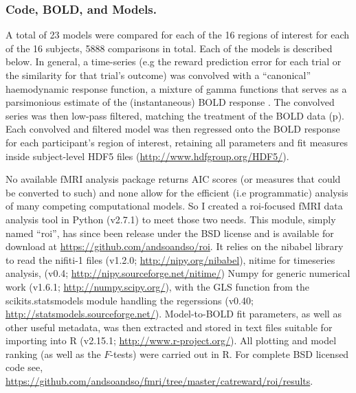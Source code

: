 \documentclass[doc,12pt]{apa}        %
\begin{document}
\subsubsection{Code, BOLD, and Models.}
\label{sub:cmb}
A total of 23 models were compared for each of the 16 regions of interest for each of the 16 subjects, 5888 comparisons in total.  Each of the models is described below.  In general, a time-series (e.g the reward prediction error for each trial or the similarity for that trial's outcome) was convolved with a ``canonical''  haemodynamic response function, a mixture of gamma functions that serves as a parsimonious estimate of the (instantaneous) BOLD response \cite{Friston:1998p2022}.  The convolved series was then low-pass filtered, matching the treatment of the BOLD data (p\pageref{subsub:preprocessed}).  Each convolved and filtered model was then regressed onto the BOLD response for each participant's region of interest, retaining all parameters and fit measures inside subject-level HDF5 files (\url{http://www.hdfgroup.org/HDF5/}).  

No available fMRI analysis package returns AIC scores (or measures that could be converted to such) and none allow for the efficient (i.e programmatic) analysis of many competing computational models. So I created a roi-focused fMRI data analysis tool in Python (v2.7.1) to meet those two needs.  This module, simply named ``roi'', has since been release under the BSD license and is available for download at \url{https://github.com/andsoandso/roi}. It relies on the nibabel library to read the nifiti-1 files  (v1.2.0; \url{http://nipy.org/nibabel}), nitime for timeseries analysis, (v0.4; \url{http://nipy.sourceforge.net/nitime/}) Numpy for generic numerical work (v1.6.1; \url{http://numpy.scipy.org/}), with the GLS function from the scikits.statsmodels module handling the regerssions (v0.40; \url{http://statsmodels.sourceforge.net/}).  Model-to-BOLD fit parameters, as well as other useful metadata, was then extracted and stored in text files suitable for importing into R (v2.15.1; \url{http://www.r-project.org/}).  All plotting and model ranking (as well as the $F$-tests) were carried out in R.  For complete BSD licensed code see, \url{https://github.com/andsoandso/fmri/tree/master/catreward/roi/results}.
\end{document}
